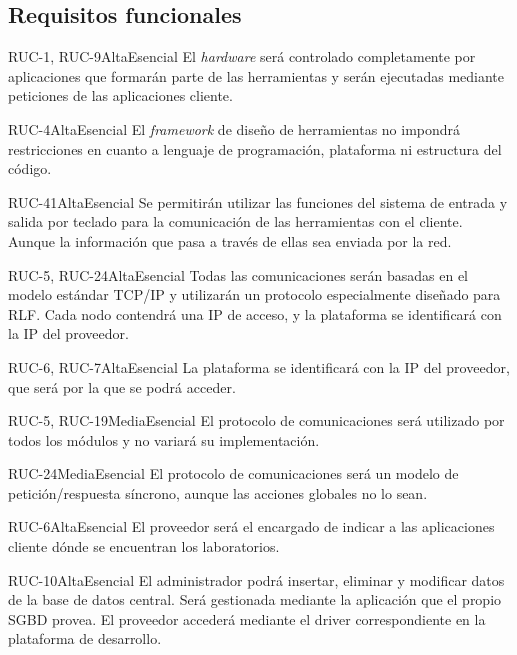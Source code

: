 

\subsection{Requisitos funcionales}

{RUC-1, RUC-9}{Alta}{Esencial}
{
El \emph{hardware} será controlado completamente por aplicaciones 
que formarán parte de las herramientas y serán ejecutadas mediante 
peticiones de las aplicaciones cliente.
}

{RUC-4}{Alta}{Esencial}
{
El \emph{framework} de diseño de herramientas no impondrá 
restricciones en cuanto a lenguaje de programación, plataforma ni 
estructura del código.
}

{RUC-41}{Alta}{Esencial}
{
Se permitirán utilizar las funciones del sistema de entrada y salida 
por teclado para la comunicación de las herramientas con el cliente. 
Aunque la información que pasa a través de ellas sea enviada por la red.
}

{RUC-5, RUC-24}{Alta}{Esencial}
{
Todas las comunicaciones serán basadas en el modelo estándar TCP/IP y 
utilizarán un protocolo especialmente diseñado para RLF. Cada nodo 
contendrá una IP de acceso, y la plataforma se identificará con la IP 
del proveedor.
}

{RUC-6, RUC-7}{Alta}{Esencial}
{
La plataforma se identificará con la IP del proveedor, que será por 
la que se podrá acceder.
}

{RUC-5, RUC-19}{Media}{Esencial}
{
El protocolo de comunicaciones será utilizado por todos los módulos y 
no variará su implementación.
}

{RUC-24}{Media}{Esencial}
{
El protocolo de comunicaciones será un modelo de petición/respuesta 
síncrono, aunque las acciones globales no lo sean.
}

{RUC-6}{Alta}{Esencial}
{
El proveedor será el encargado de indicar a las aplicaciones cliente 
dónde se encuentran los laboratorios.
}

{RUC-10}{Alta}{Esencial}
{
El administrador podrá insertar, eliminar y modificar datos de la base 
de datos central. Será gestionada mediante la aplicación que el 
propio SGBD provea. El proveedor accederá mediante el driver 
correspondiente en la plataforma de desarrollo.
}

